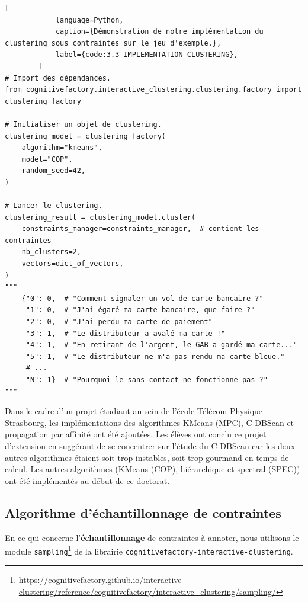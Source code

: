 		
		\begin{lstlisting}[
			language=Python,
			caption={Démonstration de notre implémentation du clustering sous contraintes sur le jeu d'exemple.},
			label={code:3.3-IMPLEMENTATION-CLUSTERING},
		]
# Import des dépendances.
from cognitivefactory.interactive_clustering.clustering.factory import clustering_factory

# Initialiser un objet de clustering.
clustering_model = clustering_factory(
    algorithm="kmeans",
	model="COP",
    random_seed=42,
)

# Lancer le clustering.
clustering_result = clustering_model.cluster(
    constraints_manager=constraints_manager,  # contient les contraintes
    nb_clusters=2,
    vectors=dict_of_vectors,
)
"""
    {"0": 0,  # "Comment signaler un vol de carte bancaire ?"
     "1": 0,  # "J'ai égaré ma carte bancaire, que faire ?"
     "2": 0,  # "J'ai perdu ma carte de paiement"
     "3": 1,  # "Le distributeur a avalé ma carte !"
     "4": 1,  # "En retirant de l'argent, le GAB a gardé ma carte..."
     "5": 1,  # "Le distributeur ne m'a pas rendu ma carte bleue."
     # ...
     "N": 1}  # "Pourquoi le sans contact ne fonctionne pas ?"
"""
		\end{lstlisting}
		
		\begin{leftBarInformation}
			Dans le cadre d'un projet étudiant au sein de l'école Télécom Physique Strasbourg, les implémentations des algorithmes KMeans (MPC), C-DBScan et propagation par affinité ont été ajoutées. Les élèves ont conclu ce projet d'extension en suggérant de se concentrer sur l'étude du C-DBScan car les deux autres algorithmes étaient soit trop instables, soit trop gourmand en temps de calcul.
			Les autres algorithmes (KMeans (COP), hiérarchique et spectral (SPEC)) ont été implémentés au début de ce doctorat.
		\end{leftBarInformation}
		
		
		\subsection{Algorithme d'échantillonnage de contraintes}
		\label{section:3.3.4-ALGORITHMES-ECHANTILLONNAGE-DE-CONTRAINTES}
		
		En ce qui concerne l'\textbf{échantillonnage} de contraintes à annoter, nous utilisons le module \texttt{sampling}\footnote{\url{https://cognitivefactory.github.io/interactive-clustering/reference/cognitivefactory/interactive_clustering/sampling/}} de la librairie \texttt{cognitivefactory-interactive-clustering}.
		
